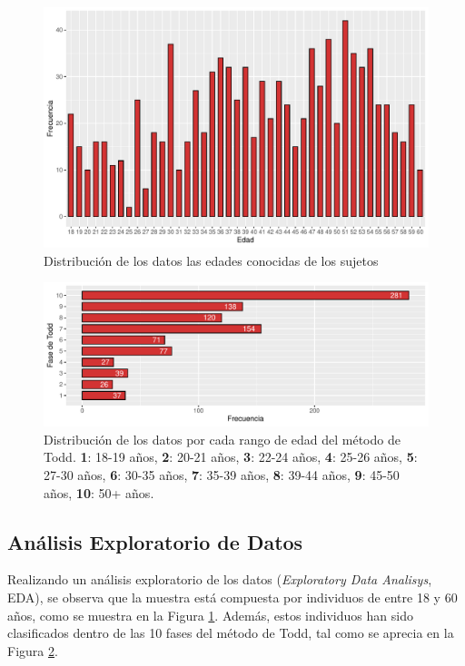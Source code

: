 \begin{figure}[h]
    \centering
    \includegraphics[width=\linewidth]{../../scripts/eda/eda_univar/char_age_distr.pdf}
    \caption[Distribución de los datos por edad]{Distribución de los datos las edades conocidas de los sujetos}
    \label{fig4:age}
\end{figure}
\begin{figure}[h]
    \centering
    \includegraphics[width=\linewidth]{../../scripts/eda/eda_univar/char_t_phase_distr.pdf}
    \caption[Distribución de los datos por cada rango de edad]{Distribución de los datos por cada rango de edad del método de Todd. \textbf{1}: 18-19 años, \textbf{2}: 20-21 años, \textbf{3}: 22-24 años, \textbf{4}: 25-26 años, \textbf{5}: 27-30 años, \textbf{6}: 30-35 años, \textbf{7}: 35-39 años, \textbf{8}: 39-44 años, \textbf{9}: 45-50 años, \textbf{10}: 50+ años.}
    \label{fig4:todd_phase}
\end{figure}

\subsection{Análisis Exploratorio de Datos}
Realizando un análisis exploratorio de los datos (\textit{Exploratory Data Analisys}, EDA), se observa que la muestra está compuesta por individuos de entre 18 y 60 años, como se muestra en la Figura \ref{fig4:age}. Además, estos individuos han sido clasificados dentro de las 10 fases del método de Todd, tal como se aprecia en la Figura \ref{fig4:todd_phase}.

